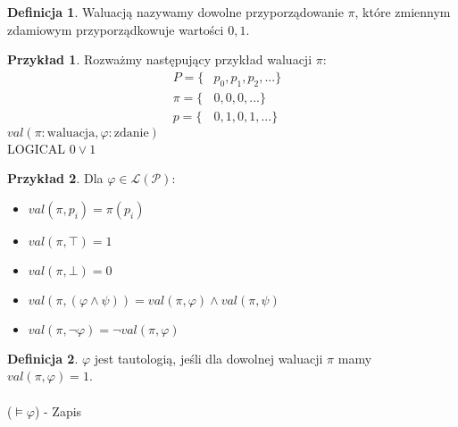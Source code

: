 \documentclass{article}
\theoremstyle{definition}
\newtheorem{de}{Definicja}[subsection]
\theoremstyle{definition}
\theoremstyle{definition}
\newtheorem{pk}{Przykład}[subsection]
\theoremstyle{definition}
\begin{document}
\begin{de}
    Waluacją nazywamy dowolne przyporządowanie $\pi$, które zmiennym zdamiowym przyporządkowuje wartości $0,1$.
\end{de}

\begin{pk}
    Rozważmy następujący przykład waluacji $\pi$:
    \begin{align*}
        P=\{&p_0,p_1,p_2,...\}&\\
        \pi=\{&0,0,0,...\}&\\
        p=\{&0,1,0,1,...\}&
    \end{align*}
    $val(\pi: \text{waluacja}, \varphi: \text{zdanie})$\\
    LOGICAL $0 \lor 1$
\end{pk}

\begin{pk}
Dla $\varphi \in \mathcal{L}(\mathcal{P})$:
\begin{itemize}
    \item $val(\pi, p_i)=\pi(p_i)$
    \item $val(\pi, \top)=1$
    \item $val(\pi, \bot)=0$
    \item $val(\pi, (\varphi \land \psi))=val(\pi, \varphi)\land val(\pi, \psi)$
    \item $val(\pi, \neg \varphi)=\neg val(\pi, \varphi)$
\end{itemize}
\end{pk}

\begin{de}
    $\varphi$ jest tautologią, jeśli dla dowolnej waluacji $\pi$ mamy $val(\pi, \varphi)=1$.
    \\\\($\models \varphi$) - Zapis
\end{de}
\end{document}
